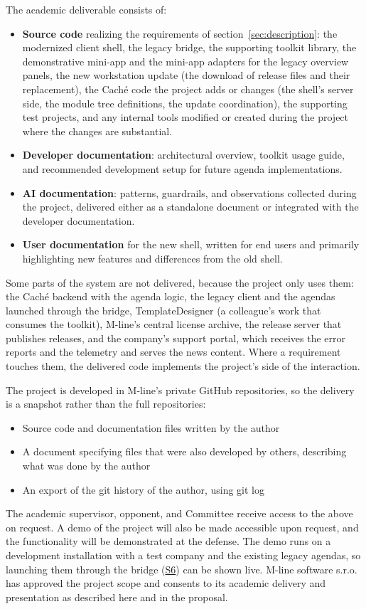 \documentclass{article}
\newcommand{\req}[1]{\hyperlink{req:#1}{#1}}
\begin{document}
\noindent The academic deliverable consists of:
\begin{itemize}
  \item \textbf{Source code} realizing the requirements of section~\ref{sec:description}: the modernized client shell, the legacy bridge, the supporting toolkit library, the demonstrative mini-app and the mini-app adapters for the legacy overview panels, the new workstation update (the download of release files and their replacement), the Caché code the project adds or changes (the shell's server side, the module tree definitions, the update coordination), the supporting test projects, and any internal tools modified or created during the project where the changes are substantial.
  \item \textbf{Developer documentation}: architectural overview, toolkit usage guide, and recommended development setup for future agenda implementations.
  \item \textbf{AI documentation}: patterns, guardrails, and observations collected during the project, delivered either as a standalone document or integrated with the developer documentation.
  \item \textbf{User documentation} for the new shell, written for end users and primarily highlighting new features and differences from the old shell.
\end{itemize}

Some parts of the system are not delivered, because the project only uses them: the Caché backend with the agenda logic, the legacy client and the agendas launched through the bridge, TemplateDesigner (a colleague's work that consumes the toolkit), M-line's central license archive, the release server that publishes releases, and the company's support portal, which receives the error reports and the telemetry and serves the news content. Where a requirement touches them, the delivered code implements the project's side of the interaction.

The project is developed in M-line's private GitHub repositories, so the delivery is a snapshot rather than the full repositories:
\begin{itemize}
  \item Source code and documentation files written by the author
  \item A document specifying files that were also developed by others, describing what was done by the author
  \item An export of the git history of the author, using git log
\end{itemize}
The academic supervisor, opponent, and Committee receive access to the above on request. A demo of the project will also be made accessible upon request, and the functionality will be demonstrated at the defense. The demo runs on a development installation with a test company and the existing legacy agendas, so launching them through the bridge (\req{S6}) can be shown live. M-line software s.r.o. has approved the project scope and consents to its academic delivery and presentation as described here and in the proposal.
\end{document}
